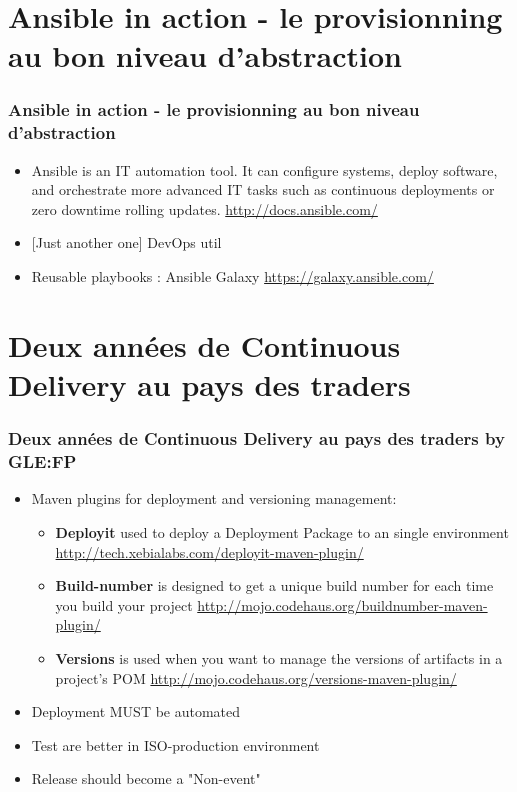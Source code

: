 \documentclass[presentation]{beamer}
\begin{document}
\section{Ansible in action - le provisionning au bon niveau d'abstraction}

\begin{frame}
\frametitle{Ansible in action - le provisionning au bon niveau d'abstraction}

\begin{itemize}
\item Ansible is an IT automation tool. It can configure systems, deploy software, and orchestrate more advanced IT tasks such as continuous deployments or zero downtime rolling updates.
\url{http://docs.ansible.com/}
\item {[Just another one]} DevOps util
\item Reusable playbooks : Ansible Galaxy
\url{https://galaxy.ansible.com/}
\end{itemize}

\end{frame}

\section{Deux ann\'ees de Continuous Delivery au pays des traders}

\begin{frame}
\frametitle{Deux ann\'ees de Continuous Delivery au pays des traders by GLE:FP}

\begin{itemize}
\item Maven plugins for deployment and versioning management:
\begin{itemize}
\item \textbf{Deployit} used to deploy a Deployment Package to an single environment
\url{http://tech.xebialabs.com/deployit-maven-plugin/}
\item \textbf{Build-number} is designed to get a unique build number for each time you build your project
\url{http://mojo.codehaus.org/buildnumber-maven-plugin/}
\item \textbf{Versions} is used when you want to manage the versions of artifacts in a project's POM
\url{http://mojo.codehaus.org/versions-maven-plugin/}
\end{itemize}
\item Deployment MUST be automated
\item Test are better in ISO-production environment
\item Release should become a "Non-event"
\end{itemize}

\end{frame}
\end{document}
